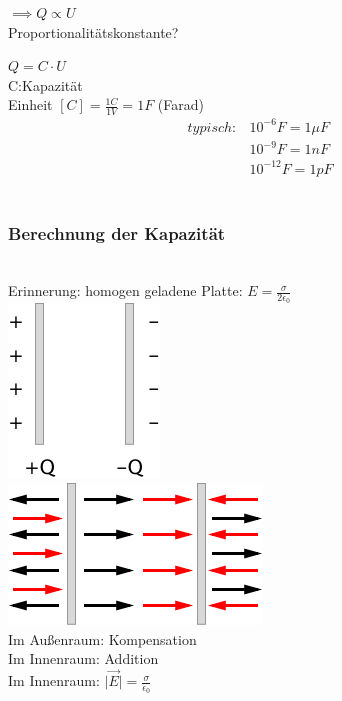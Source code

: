 \documentclass[11pt]{article}
\begin{document}
$ \implies Q\propto U $\\

Proportionalitätskonstante?

$\boxed{Q=C\cdot U}$\\

C:Kapazität\\
Einheit $[C]=\frac{1C}{1V}=1F$ (Farad)\\

\begin{align*}
	typisch:& 10^{-6}F=1\mu F\\
	& 10^{-9}F=1nF\\
	& 10^{-12}F=1pF
\end{align*}\\

\subsubsection{Berechnung der Kapazität}
\hfill\\
Erinnerung: homogen geladene Platte: $E=\frac{\sigma}{2\epsilon_0}$\\

\includegraphics{skizzen/14/14_8B5}\\

\includegraphics{skizzen/14/14_8B6}\\

Im Au\ss{}enraum: Kompensation\\
Im Innenraum: Addition\\

Im Innenraum: $\vert\vec{E}\vert=\frac{\sigma}{\epsilon_0}$\\
\end{document}
